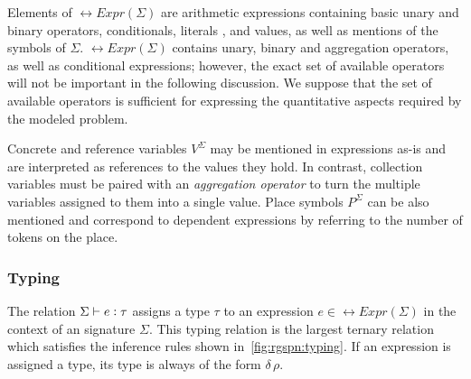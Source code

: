 Elements of \(\rel{Expr}(\Sigma)\) are arithmetic expressions containing basic unary and binary operators, conditionals, literals ,  and  values, as well as mentions of the symbols of \(\Sigma\). \(\rel{Expr}(\Sigma)\) contains unary, binary and aggregation operators, as well as conditional expressions; however, the exact set of available operators will not be important in the following discussion. We suppose that the set of available operators is sufficient for expressing the quantitative aspects required by the modeled problem.

Concrete and reference variables \(V^\Sigma\) may be mentioned in expressions as-is and are interpreted as references to the values they hold. In contrast, collection variables must be paired with an \emph{aggregation operator} to turn the multiple variables assigned to them into a single value. Place symbols \(P^\Sigma\) can be also mentioned and correspond to  dependent expressions by referring to the number of tokens on the place.

\subsubsection{Typing}

The relation \(\Sigma \vdash e \mathrel{\vcentcolon} \tau\) assigns a type \(\tau\) to an expression \(e \in \rel{Expr}(\Sigma)\) in the context of an  signature \(\Sigma\). This typing relation is the largest ternary relation which satisfies the inference rules shown in~\cref{fig:rgspn:typing}. If an expression is assigned a type, its type is always of the form \(\delta\,\rho\).


